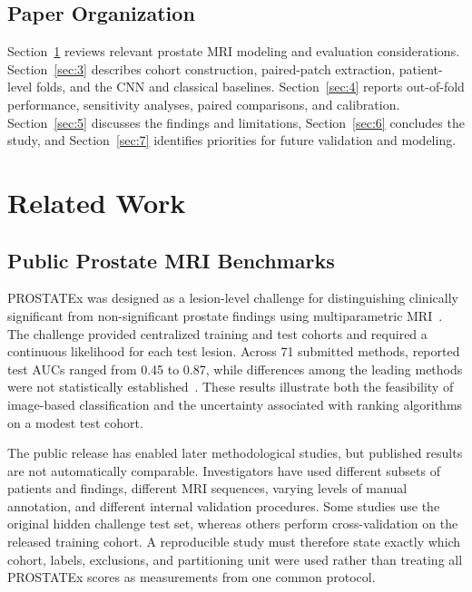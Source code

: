 \documentclass[11pt]{article}
\begin{document}
\subsection{Paper Organization}\label{sec:1.2}

Section~\ref{sec:2} reviews relevant prostate MRI modeling and evaluation considerations. Section~\ref{sec:3} describes cohort construction, paired-patch extraction, patient-level folds, and the CNN and classical baselines. Section~\ref{sec:4} reports out-of-fold performance, sensitivity analyses, paired comparisons, and calibration. Section~\ref{sec:5} discusses the findings and limitations, Section~\ref{sec:6} concludes the study, and Section~\ref{sec:7} identifies priorities for future validation and modeling.

\section{Related Work}\label{sec:2}

\subsection{Public Prostate MRI Benchmarks}\label{sec:2.1}

PROSTATEx was designed as a lesion-level challenge for distinguishing clinically significant from non-significant prostate findings using multiparametric MRI~\cite{prostatex,armato-prostatex}. The challenge provided centralized training and test cohorts and required a continuous likelihood for each test lesion. Across 71 submitted methods, reported test AUCs ranged from 0.45 to 0.87, while differences among the leading methods were not statistically established~\cite{armato-prostatex}. These results illustrate both the feasibility of image-based classification and the uncertainty associated with ranking algorithms on a modest test cohort.

The public release has enabled later methodological studies, but published results are not automatically comparable. Investigators have used different subsets of patients and findings, different MRI sequences, varying levels of manual annotation, and different internal validation procedures. Some studies use the original hidden challenge test set, whereas others perform cross-validation on the released training cohort. A reproducible study must therefore state exactly which cohort, labels, exclusions, and partitioning unit were used rather than treating all PROSTATEx scores as measurements from one common protocol.
\end{document}
